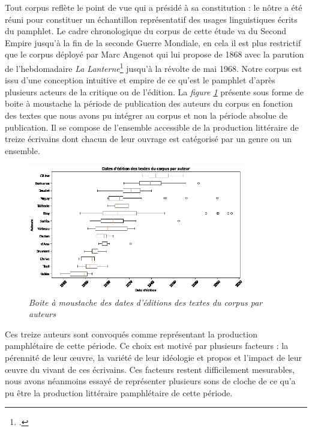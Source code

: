 Tout corpus reflète le point de vue qui a présidé à sa constitution : le nôtre a été réuni pour constituer un échantillon représentatif des usages linguistiques écrits du pamphlet.  Le cadre chronologique du corpus de cette étude va du Second Empire jusqu'à la fin de la seconde Guerre Mondiale, en cela il est plus restrictif que le corpus déployé par Marc Angenot qui lui propose de 1868 avec la parution de l'hebdomadaire \textit{La Lanterne}\footcites{rochefort_lanterne_1868} jusqu'à la révolte de mai 1968. Notre corpus est issu d'une conception intuitive et empire de ce qu'est le pamphlet d'après plusieurs acteurs de la critique ou de l'édition. La \textit{figure \ref{'fig:dates_editions'}} présente sous forme de boite à moustache la période de publication des auteurs du corpus en fonction des textes que nous avons pu intégrer au corpus et non la période absolue de publication. Il se compose de l'ensemble accessible de la production littéraire de treize écrivains dont chacun de leur ouvrage est catégorisé par un genre ou un ensemble.
\begin{figure}[H]
\centering %
\includegraphics[width=0.85\textwidth]{img/M2_boxplot_corpus_chronologique.jpg}
\caption{\textit{Boite à moustache des dates d'éditions des textes du corpus par auteurs}}
\label{'fig:dates_editions'}
\end{figure}

Ces treize auteurs sont convoqués comme représentant la production pamphlétaire de cette période.  Ce choix est motivé par plusieurs facteurs : la pérennité de leur œuvre, la variété de leur idéologie et propos et l'impact de leur œuvre du vivant de ces écrivains. Ces facteurs restent difficilement mesurables, nous avons néanmoins essayé de représenter plusieurs sons de cloche de ce qu'a pu être la production littéraire pamphlétaire de cette période. 

